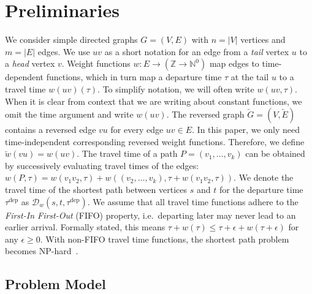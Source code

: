 \documentclass[a4paper,UKenglish,cleveref, autoref, thm-restate,anonymous]{lipics-v2021}
\newcommand*{\dist}{\mathcal{D}}
\newcommand*{\tdep}{\tau^{\operatorname{dep}}}
\begin{document}
\section{Preliminaries}
We consider simple directed graphs $G=(V,E)$ with $n=|V|$ vertices and $m=|E|$ edges.
We use $uv$ as a short notation for an edge from a \emph{tail} vertex $u$ to a \emph{head} vertex $v$.
Weight functions $w : E \to (\mathbb{Z} \to \mathbb{N}^0)$ map edges to time-dependent functions, which in turn map a departure time $\tau$ at the tail $u$ to a travel time $w(uv)(\tau)$.
To simplify notation, we will often write $w(uv, \tau)$.
When it is clear from context that we are writing about constant functions, we omit the time argument and write $w(uv)$.
The reversed graph $\overleftarrow{G} = (V, \overleftarrow{E})$ contains a reversed edge $vu$ for every edge $uv \in E$.
In this paper, we only need time-independent corresponding reversed weight functions.
Therefore, we define $\overleftarrow{w}(vu) = w(uv)$.
The travel time of a path $P = (v_1,\dots,v_k)$ can be obtained by successively evaluating travel times of the edges: $w(P, \tau) = w(v_1 v_2, \tau) + w((v_2,\dots,v_k), \tau + w(v_1 v_2, \tau))$.
We denote the travel time of the shortest path between vertices $s$ and $t$ for the departure time $\tdep$ as $\dist_w(s,t,\tdep)$.
We assume that all travel time functions adhere to the \emph{First-In First-Out} (FIFO) property, i.e.\ departing later may never lead to an earlier arrival.
Formally stated, this means $\tau + w(\tau) \leq \tau + \epsilon + w(\tau + \epsilon)$ for any $\epsilon \geq 0$.
With non-FIFO travel time functions, the shortest path problem becomes \textsf{NP}-hard~\cite{or-tnp-89}.

\subsection{Problem Model}
\end{document}

